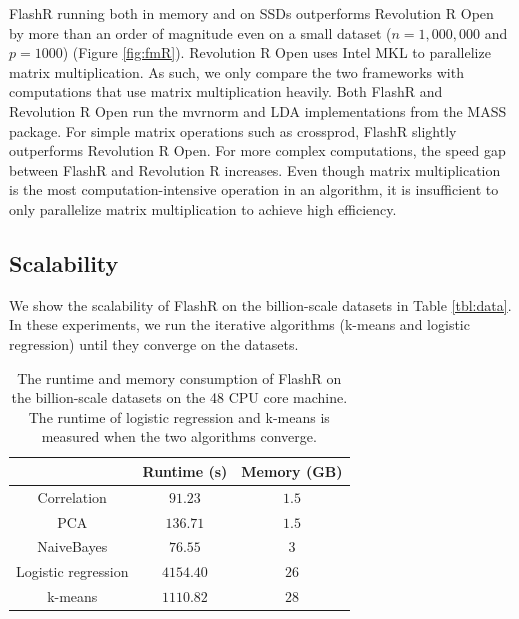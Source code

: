 FlashR running both in memory and on SSDs outperforms Revolution R Open by more
than an order of magnitude even on a small dataset ($n=1,000,000$ and $p=1000$)
(Figure \ref{fig:fmR}).
Revolution R Open uses Intel MKL to parallelize matrix multiplication. As such,
we only compare the two frameworks with computations that use matrix
multiplication heavily. Both FlashR and Revolution R Open run the mvrnorm
and LDA implementations from the MASS package. For simple matrix operations such as crossprod,
FlashR slightly outperforms Revolution R Open. For more complex computations,
the speed gap between FlashR and Revolution R increases. Even though matrix multiplication
is the most computation-intensive operation in an algorithm, it is insufficient
to only parallelize matrix multiplication to achieve high efficiency.

\subsection{Scalability}

We show the scalability of FlashR on the billion-scale datasets in Table
\ref{tbl:data}. In these experiments, we run the iterative algorithms
(k-means and logistic regression) until they converge on the datasets.

\begin{table}
\begin{center}
\caption{The runtime and memory consumption of FlashR on the billion-scale
	datasets on the 48 CPU core machine. The runtime of logistic regression
	and k-means is measured when the two algorithms converge.}
\vspace{-10pt}
\footnotesize
\begin{tabular}{|c|c|c|}
\hline
	& Runtime (s) & Memory (GB) \\
\hline
Correlation & $91.23$ & $1.5$ \\
\hline
PCA & $136.71$ & $1.5$ \\
\hline
NaiveBayes & $76.55$ & $3$ \\
\hline
Logistic regression & $4154.40$ & $26$ \\
\hline
k-means & $1110.82$ & $28$ \\
\hline
\end{tabular}
\normalsize
\label{tbl:scale}
\end{center}
\end{table}

